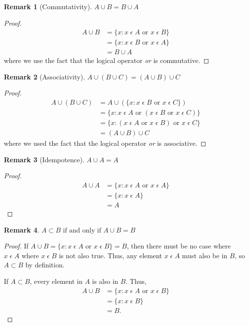 \documentclass[12pt]{article}
\newtheorem{remark}{Remark}
\begin{document}
\begin{remark}[Commutativity]
    $A \cup B = B \cup A$
\end{remark}
\begin{proof}
    \begin{align*}
        A \cup B &= \{x: x\;\epsilon\;A \text{ or } x\;\epsilon\;B\}\\
                 &= \{x: x\;\epsilon\;B \text{ or } x\;\epsilon\;A\}\\
                 &= B \cup A
    \end{align*}
    where we use the fact that the logical operator \textit{or} is commutative.
\end{proof}

\begin{remark}[Associativity]
    $A \cup (B \cup C) = (A \cup B) \cup C$
\end{remark}
\begin{proof}
    \begin{align*}
        A \cup (B \cup C) &= A \cup (\{x: x\;\epsilon\;B \text{ or } x\;\epsilon\;C\})\\
                          &= \{x: x\;\epsilon\;A \text{ or } (x\;\epsilon\;B \text{ or } x\;\epsilon\;C)\}\\
                          &= \{x: (x\;\epsilon\;A \text{ or } x\;\epsilon\;B) \text{ or } x\;\epsilon\;C\}\\
                          &= (A \cup B) \cup C
    \end{align*}
    where we used the fact that the logical operator \textit{or} is associative.
\end{proof}

\begin{remark}[Idempotence]
    $A \cup A = A$
\end{remark}
\begin{proof}
    \begin{align*}
        A \cup A &= \{x: x\;\epsilon\;A \text{ or } x\;\epsilon\;A\}\\
                 &= \{x: x\;\epsilon\;A\}\\\
                 &= A
    \end{align*}
\end{proof}

\begin{remark}
    $A \subset B \text{ if and only if } A \cup B = B$
\end{remark}
\begin{proof}
    If $A \cup B = \{x: x\;\epsilon\;A\text{ or } x\;\epsilon\;B\} = B$, then there must be no case
    where $x\;\epsilon\;A$ where $x\;\epsilon\;B$ is not also true.
    Thus, any element $x\;\epsilon\;A$ must also be in $B$, so $A \subset B$ by definition.

    If $A\subset B$, every element in $A$ is also in $B$. Thus,
    \begin{align*}
        A \cup B &= \{x: x\;\epsilon\;A\text{ or } x\;\epsilon\;B\}\\
                 &= \{x: x\;\epsilon\;B\}\\
                 &= B.
    \end{align*}
\end{proof}
\end{document}
